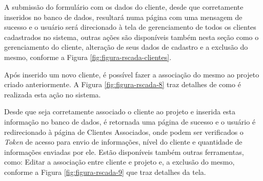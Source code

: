 A submissão do formulário com os dados do cliente, desde que corretamente inseridos no banco de dados, resultará numa página com uma mensagem de sucesso e o usuário será direcionado à tela de gerenciamento de todos os clientes cadastrados no sistema, outras ações são disponíveis também nesta seção como o gerenciamento do cliente, alteração de seus dados de cadastro e a exclusão do mesmo, conforme a Figura \ref{fig:figura-rscada-clientes}.
    	
    	\begin{figure}[!h]
    	\end{figure}
    	
Após inserido um novo cliente, é possível fazer a associação do mesmo ao projeto criado anteriormente. A Figura \ref{fig:figura-rscada-8} traz detalhes de como é realizada esta ação no sistema.
    	
        \begin{figure}[!h]
    	\end{figure}

Desde que seja corretamente associado o cliente ao projeto e inserida esta informação no banco de dados, é retornada uma página de sucesso e o usuário é redirecionado à página de Clientes Associados, onde podem ser verificados o \textit{Token} de acesso para envio de informações, nível do cliente e quantidade de informações enviadas por ele. Estão disponíveis também outras ferramentas, como: Editar a associação entre cliente e projeto e, a exclusão do mesmo, conforme a Figura \ref{fig:figura-rscada-9} que traz detalhes da tela.

